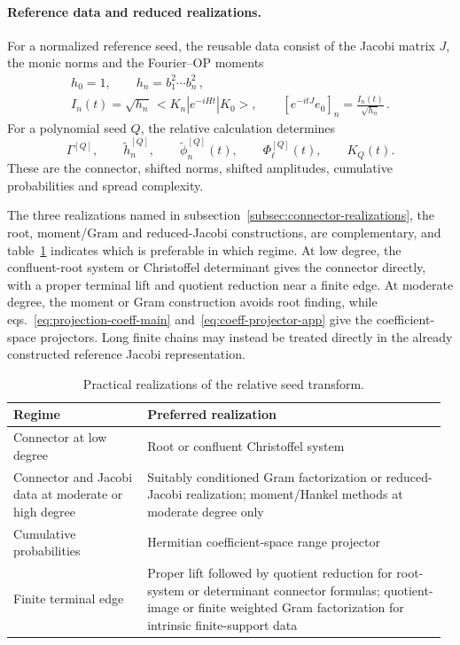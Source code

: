 \documentclass[a4paper,11pt]{article}
\def\ket#1{|#1>}%
\def\bra#1{<#1|}%
\def\ii{i}%
\def\ee{e}%
\def\Jac{J}%
\theoremstyle{definition}
\theoremstyle{remark}
\newcommand{\ket}[1]{|#1\rangle}
\newcommand{\bra}[1]{\langle #1|}
\newcommand{\ii}{\mathrm i}
\newcommand{\ee}{\mathrm e}
\newcommand{\Jac}{\mathsf J}
\newcommand{\tphi}{\widetilde\phi}
\newcommand{\thh}{\widetilde h}
\begin{document}
\paragraph{Reference data and reduced realizations.}
For a normalized reference seed, the reusable data consist of the
Jacobi matrix $\Jac$, the monic norms and the Fourier--OP moments
\begin{equation}
\begin{gathered}
   h_0=1,\qquad h_n=b_1^2\cdots b_n^2\,,\\
   I_n(t)=\sqrt{h_n}\,
   \bra{K_n}\ee^{-\ii Ht}\ket{K_0},
   \qquad
   [\ee^{-\ii t\Jac}e_0]_n=\frac{I_n(t)}{\sqrt{h_n}}\,.
\end{gathered}
\end{equation}
  For a polynomial seed $Q$, the relative calculation
determines
\begin{equation}
   \Gamma^{[Q]},\qquad
   \thh_n^{[Q]},\qquad
   \tphi_n^{[Q]}(t),\qquad
   \Phi_\ell^{[Q]}(t),\qquad
   K_Q(t).
   \label{eq:numerical-relative-outputs-app}
\end{equation}
These are the connector, shifted norms, shifted amplitudes, cumulative
probabilities and spread complexity.

The three realizations named in subsection~\ref{subsec:connector-realizations}, the root,
moment/Gram and reduced-Jacobi constructions, are 
complementary, and table~\ref{tab:christoffel-hierarchy} indicates which is preferable in which
regime.  At low degree, the confluent-root system or Christoffel
determinant gives the connector directly, with a proper terminal lift
and quotient reduction near a finite edge.  At moderate degree, the
moment or Gram construction avoids root finding, while
eqs.~\eqref{eq:projection-coeff-main}
and~\eqref{eq:coeff-projector-app} give the coefficient-space
projectors.  Long finite chains may instead be treated directly in the
already constructed reference Jacobi representation.

\begin{table}[htbp]
\centering
\renewcommand{\arraystretch}{1.15}
\begin{tabular}{@{}p{0.30\linewidth} p{0.67\linewidth}@{}}
\toprule
\textbf{Regime} & \textbf{Preferred realization} \\
\midrule
Connector at low degree & Root or confluent Christoffel system \\
Connector and Jacobi data at moderate or high degree & Suitably conditioned Gram factorization or reduced-Jacobi realization; moment/Hankel methods at moderate degree only \\
Cumulative probabilities & Hermitian coefficient-space range projector \\
Finite terminal edge & Proper lift followed by quotient reduction for root-system or determinant connector formulas; quotient-image or finite weighted Gram factorization for intrinsic finite-support data \\
\bottomrule
\end{tabular}
\caption{Practical realizations of the relative seed transform.}
\label{tab:christoffel-hierarchy}
\end{table}
\end{document}
